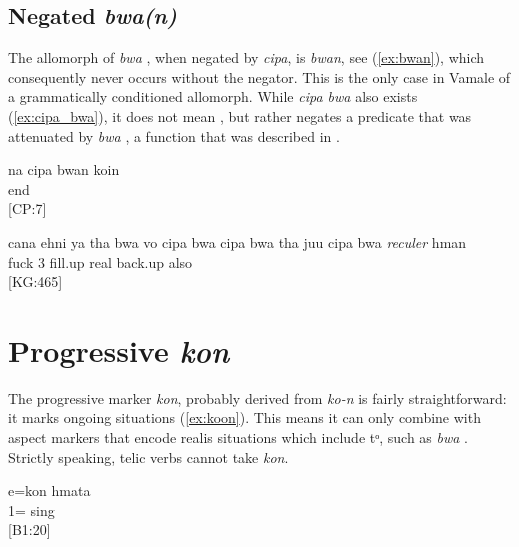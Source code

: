 \subsection{Negated \textit{bwa(n)}}

%
%
%
%
%
The allomorph of \textit{bwa} , when negated by \textit{cipa}, is \textit{bwan}, see (\ref{ex:bwan}), which consequently never occurs without the negator. This is the only case in Vamale of a grammatically conditioned allomorph. While \textit{cipa bwa} also exists (\ref{ex:cipa_bwa}), it does not mean , but rather negates a predicate that was attenuated by \textit{bwa} , a function that was described in .

\ea \label{ex:bwan} 
\gll  na cipa bwan koin\\
    end\\
\glt {} {[CP:7]}
\z


\ea\label{ex:cipa_bwa} 
\gll cana ehni ya tha bwa vo cipa bwa cipa bwa tha juu cipa bwa \textit{reculer} hman\\
 fuck  3   fill.up      real   back.up also\\
\glt {} {[KG:465]}
\z


\section{Progressive \textit{kon}}
\label{sec:kon}
The progressive marker \textit{kon}, probably derived from \textit{ko-n}  is fairly straightforward: it marks ongoing situations (\ref{ex:koon}). This means it can only combine with aspect markers that encode realis situations which include tᵒ, such as \textit{bwa} . Strictly speaking, telic verbs cannot take \textit{kon}.

\ea \label{ex:koon} 
\gll e=kon hmata \\
 1= sing\\
\glt {} {[B1:20]}
\z

